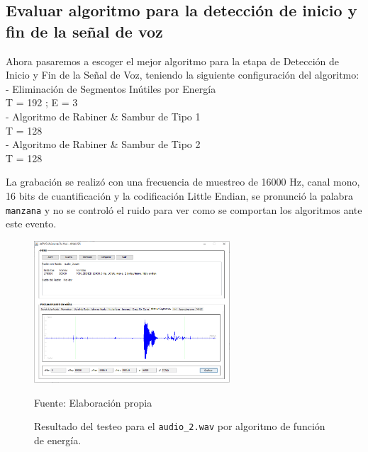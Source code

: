 

\subsection{Evaluar algoritmo para la detección de inicio y fin de la señal de voz}
Ahora pasaremos a escoger el mejor algoritmo para la etapa de Detección de Inicio y Fin de la Señal de Voz, teniendo la siguiente configuración del algoritmo: \\
- Eliminación de Segmentos Inútiles por Energía \\
\hspace*{1cm} T = 192 ; \qquad E = 3 \\
- Algoritmo de Rabiner \& Sambur de Tipo 1 \\
\hspace*{1cm} T = 128 \\
- Algoritmo de Rabiner \& Sambur de Tipo 2 \\
\hspace*{1cm} T = 128 

La grabación se realizó con una frecuencia de muestreo de 16000 Hz, canal mono, 16 bits de cuantificación y la codificación Little Endian, se pronunció la palabra \texttt{manzana} y no se controló el ruido para ver como se comportan los algoritmos ante este evento.

\begin{figure}[H]
\begin{center}
\includegraphics[width=0.65\textwidth]{Imagenes/Cap3/image074}
\end{center}
\begin{center}
\vskip -0.5cm
\caption{\small{Resultado del testeo para el \texttt{audio\_2.wav} por algoritmo de función de energía.}}
\label{fig:figura3.74}
{\small{Fuente: Elaboración propia}}
\end{center}
\end{figure}

